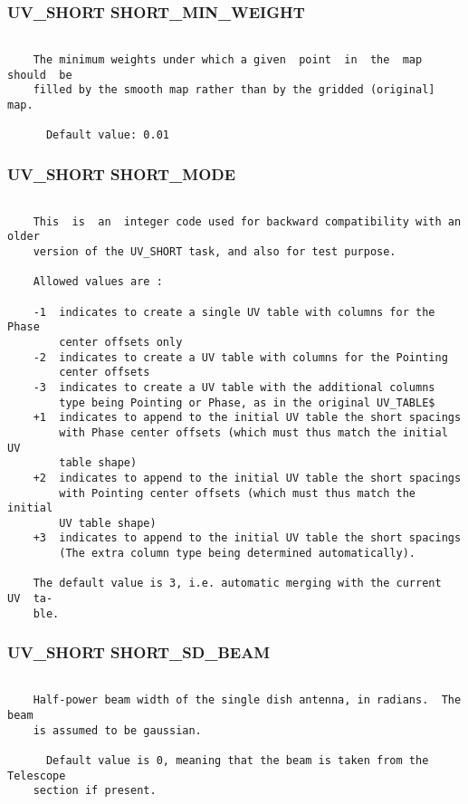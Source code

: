 \subsubsection{UV\_SHORT SHORT\_MIN\_WEIGHT}
\begin{verbatim}

    The minimum weights under which a given  point  in  the  map  should  be
    filled by the smooth map rather than by the gridded (original] map.

      Default value: 0.01

\end{verbatim}
\subsubsection{UV\_SHORT SHORT\_MODE}
\begin{verbatim}

    This  is  an  integer code used for backward compatibility with an older
    version of the UV_SHORT task, and also for test purpose.

    Allowed values are :

    -1  indicates to create a single UV table with columns for the Phase
        center offsets only
    -2  indicates to create a UV table with columns for the Pointing
        center offsets
    -3  indicates to create a UV table with the additional columns
        type being Pointing or Phase, as in the original UV_TABLE$
    +1  indicates to append to the initial UV table the short spacings
        with Phase center offsets (which must thus match the initial UV
        table shape)
    +2  indicates to append to the initial UV table the short spacings
        with Pointing center offsets (which must thus match the initial
        UV table shape)
    +3  indicates to append to the initial UV table the short spacings
        (The extra column type being determined automatically).

    The default value is 3, i.e. automatic merging with the current  UV  ta-
    ble.

\end{verbatim}
\subsubsection{UV\_SHORT SHORT\_SD\_BEAM}
\begin{verbatim}

    Half-power beam width of the single dish antenna, in radians.  The  beam
    is assumed to be gaussian.

      Default value is 0, meaning that the beam is taken from the  Telescope
    section if present.

\end{verbatim}

